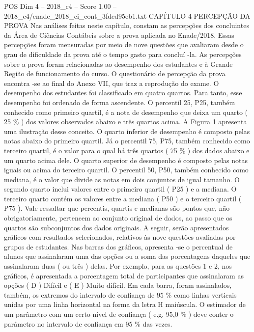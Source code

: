 \begin{textsample}{POS Dim 4 – 2018\_c4 – Score 1.00 – 2018\_c4/enade\_2018\_ci\_cont\_3fded95eb1.txt}  \label{ex:f4_pos_183}
CAPÍTULO 4 PERCEPÇÃO DA PROVA Nas análises feitas neste capítulo, constam as percepções dos concluintes da Área de Ciências Contábeis sobre a prova aplicada no Enade/2018.
Essas percepções foram mensuradas por meio de nove questões que avaliaram desde o grau de dificuldade da prova até o tempo gasto para concluí -la.
As percepções sobre a prova foram relacionadas ao desempenho dos estudantes e à Grande Região de funcionamento do curso.
O questionário de percepção da prova encontra -se ao final do Anexo VII, que traz a reprodução do exame.
O desempenho dos estudantes foi classificado em quatro quartos.
Para tanto, esse desempenho foi ordenado de forma ascendente.
O percentil 25, P25, também conhecido como primeiro quartil, é a nota de desempenho que deixa um quarto ( 25 \% ) dos valores observados abaixo e três quartos acima.
A Figura 1 apresenta uma ilustração desse conceito.
O quarto inferior de desempenho é composto pelas notas abaixo do primeiro quartil.
Já o percentil 75, P75, também conhecido como terceiro quartil, é o valor para o qual há três quartos ( 75 \% ) dos dados abaixo e um quarto acima dele.
O quarto superior de desempenho é composto pelas notas iguais ou acima do terceiro quartil.
O percentil 50, P50, também conhecido como mediana, é o valor que divide as notas em dois conjuntos de igual tamanho.
O segundo quarto inclui valores entre o primeiro quartil ( P25 ) e a mediana.
O terceiro quarto contém os valores entre a mediana ( P50 ) e o terceiro quartil ( P75 ).
Vale ressaltar que percentis, quartis e medianas são pontos que, não obrigatoriamente, pertencem ao conjunto original de dados, ao passo que os quartos são subconjuntos dos dados originais.
A seguir, serão apresentados gráficos com resultados selecionados, relativos às nove questões avaliadas por grupos de estudantes.
Nas barras dos gráficos, apresenta -se o percentual de alunos que assinalaram uma das opções ou a soma das porcentagens daqueles que assinalaram duas ( ou três ) delas.
Por exemplo, para as questões 1 e 2, nos gráficos, é apresentada a porcentagem total de participantes que assinalaram as opções ( D ) Difícil e ( E ) Muito difícil.
Em cada barra, foram assinalados, também, os extremos do intervalo de confiança de 95 \% como linhas verticais unidas por uma linha horizontal na forma da letra H maiúscula.
O estimador de um parâmetro com um certo nível de confiança ( e.g. 95,0 \% ) deve conter o parâmetro no intervalo de confiança em 95 \% das vezes.

\end{textsample}
